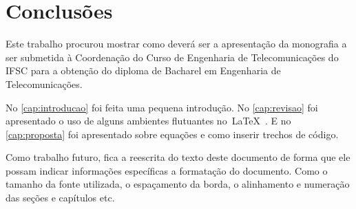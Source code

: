 \chapter{Conclusões}\label{cap:conclusoes}

Este trabalho procurou mostrar como deverá ser a apresentação da monografia a ser submetida à Coordenação do Curso de Engenharia de Telecomunicações do IFSC para a obtenção do diploma de Bacharel em Engenharia de Telecomunicações.

No \autoref{cap:introducao} foi feita uma pequena introdução. No \autoref{cap:revisao} foi apresentado o uso de alguns ambientes flutuantes no~\LaTeX~. E no \autoref{cap:proposta} foi apresentado sobre equações e como inserir trechos de código.

Como trabalho futuro, fica a reescrita do texto deste documento de forma que ele possam indicar informações específicas a formatação do documento. Como o tamanho da fonte utilizada, o espaçamento da borda, o alinhamento e numeração das seções e capítulos etc.